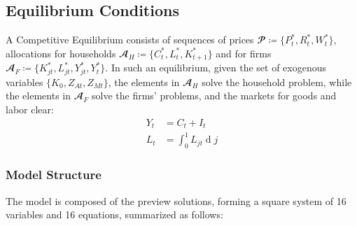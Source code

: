 \documentclass[
	12pt,
	]{article}
\numberwithin{equation}{section}
\DeclareMathOperator{\dif}{d}
\theoremstyle{definition}
\theoremstyle{plain}
\theoremstyle{plain}
\theoremstyle{plain}
\begin{document}

\subsection{Equilibrium Conditions}


A Competitive Equilibrium consists of sequences of prices $\mathbfscr{P} \coloneq \{P_t^\ast, R_t^\ast, W_t^\ast\}$, allocations for households $\mathbfscr{A}_H \coloneq \{C_t^\ast, L_t^\ast, K_{t+1}^\ast\}$ and for firms $\mathbfscr{A}_F \coloneq \{K_{jt}^\ast, L_{jt}^\ast, Y_{jt}^\ast, Y_t^\ast\}$. In such an equilibrium, given the set of exogenous variables $\{K_0, Z_{At}, Z_{Mt}\}$, the elements in $\mathbfscr{A}_H$ solve the household problem, while the elements in $\mathbfscr{A}_F$ solve the firms' problems, and the markets for goods and labor clear:
\begin{align}
	Y_t &= C_t + I_t \label{eq:market-clearing-condition} \\
	L_t &= \int_{0}^{1} L_{jt} \dif j \label{eq:market-clearing-condition-2}
\end{align}



\subsubsection{Model Structure}

The model is composed of the preview solutions, forming a square system of 16 variables and 16 equations, summarized as follows:
\end{document}
